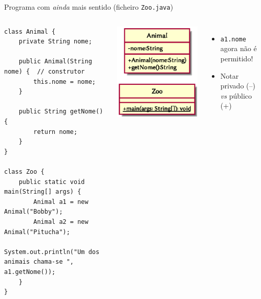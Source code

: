 \documentclass[portuguese, aspectratio=169, xcolor=table]{beamer}
\begin{document}
\begin{frame}[fragile]{Programa com \textit{ainda} mais sentido (ficheiro \texttt{Zoo.java})}
\begin{columns}
\begin{verbatim}
class Animal {
    private String nome;

    public Animal(String nome) {  // construtor
        this.nome = nome;
    }

    public String getNome() {
        return nome;
    }
}

class Zoo {
    public static void main(String[] args) {
        Animal a1 = new Animal("Bobby");
        Animal a2 = new Animal("Pitucha");
        System.out.println("Um dos animais chama-se ", a1.getNome());
    }
}
\end{verbatim}
\begin{center}
\includegraphics[width=0.4\linewidth]{./uml_diagrams/class4}
\end{center}
\begin{itemize}
    \item \texttt{a1.nome} agora não é permitido!
    \item Notar privado (--) \textit{vs} público (+)
\end{itemize}
\end{columns}
\end{frame}
\end{document}
